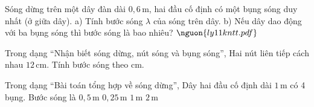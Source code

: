 \begin{ex}
Sóng dừng trên một dây đàn dài $0,6\,\text{m}$, hai đầu cố định có một bụng sóng duy nhất (ở giữa dây). a) Tính bước sóng $\lambda$ của sóng trên dây. b) Nếu dây dao động với ba bụng sóng thì bước sóng là bao nhiêu? $\nguon{ly11 kntt.pdf}$
\choiceTF

\end{ex}

\begin{ex}
Trong dạng “Nhận biết sóng dừng, nút sóng và bụng sóng”, Hai nút liên tiếp cách nhau $12\,\text{cm}$. Tính bước sóng theo cm.
\end{ex}

\begin{ex}
Trong dạng “Bài toán tổng hợp về sóng dừng”, Dây hai đầu cố định dài $1\,\text{m}$ có 4 bụng. Bước sóng là
\choice
{\True $0,5\,\text{m}$}
{$0,25\,\text{m}$}
{$1\,\text{m}$}
{$2\,\text{m}$}
\end{ex}

